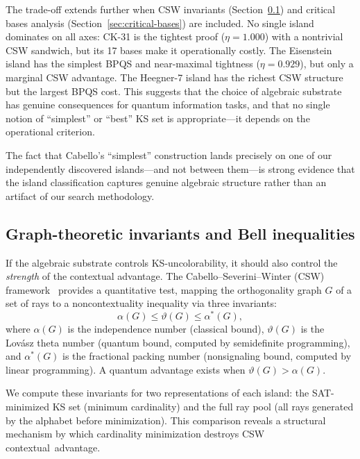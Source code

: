 \documentclass[12pt,a4paper]{article}
\begin{document}
The trade-off extends further when CSW invariants (Section~\ref{sec:csw}) and critical bases analysis (Section~\ref{sec:critical-bases}) are included. No single island dominates on all axes: CK-31 is the tightest proof ($\eta = 1.000$) with a nontrivial CSW sandwich, but its 17 bases make it operationally costly. The Eisenstein island has the simplest BPQS and near-maximal tightness ($\eta = 0.929$), but only a marginal CSW advantage. The Heegner-7 island has the richest CSW structure but the largest BPQS cost. This suggests that the choice of algebraic substrate has genuine consequences for quantum information tasks, and that no single notion of ``simplest'' or ``best'' KS set is appropriate---it depends on the operational criterion.

The fact that Cabello's ``simplest'' construction lands precisely on one of our independently discovered islands---and not between them---is strong evidence that the island classification captures genuine algebraic structure rather than an artifact of our search methodology.

\subsection{Graph-theoretic invariants and Bell inequalities}\label{sec:csw}

If the algebraic substrate controls KS-uncolorability, it should also control the \emph{strength} of the contextual advantage. The Cabello--Severini--Winter (CSW) framework~\cite{CabelloSeveriniWinter2014} provides a quantitative test, mapping the orthogonality graph $G$ of a set of rays to a noncontextuality inequality via three invariants:
\[
\alpha(G) \leq \vartheta(G) \leq \alpha^*(G),
\]
where $\alpha(G)$ is the independence number (classical bound), $\vartheta(G)$ is the Lov\'asz theta number (quantum bound, computed by semidefinite programming), and $\alpha^*(G)$ is the fractional packing number (nonsignaling bound, computed by linear programming). A quantum advantage exists when $\vartheta(G) > \alpha(G)$.

We compute these invariants for two representations of each island: the SAT-minimized KS set (minimum cardinality) and the full ray pool (all rays generated by the alphabet before minimization). This comparison reveals a structural mechanism by which cardinality minimization destroys CSW contextual~advantage.
\end{document}
